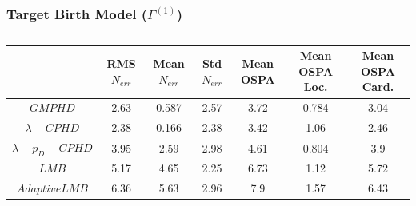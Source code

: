\documentclass{article}
\begin{document}
\subsubsection*{Target Birth Model ($\Gamma^{(1)}$)}

\begin{table}[H]
  \centering
  \begin{tabular}{ c| c | c | c | c | c | c }
    & RMS $N_{err}$ & Mean $N_{err}$ & Std $N_{err}$ & Mean OSPA & Mean OSPA Loc. & Mean OSPA Card.\\
    \hline
    $GMPHD$ & 2.63 & 0.587 & 2.57 & 3.72 & 0.784 & 3.04 \\
    $\lambda-CPHD$ & 2.38 & 0.166 & 2.38 & 3.42 & 1.06 & 2.46 \\
    $\lambda-p_D-CPHD$ & 3.95 & 2.59 & 2.98 & 4.61 & 0.804 & 3.9 \\
    $LMB$ & 5.17 & 4.65 & 2.25 & 6.73 & 1.12 & 5.72 \\
    $Adaptive LMB$ & 6.36 & 5.63 & 2.96 & 7.9 & 1.57 & 6.43 \\
  \end{tabular}
  \caption{}
  \label{tab:}
\end{table}
\end{document}
